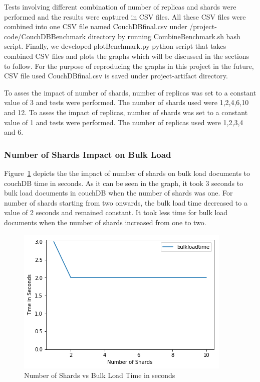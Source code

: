 Tests involving different combination of number of replicas and shards
were performed and the results were captured in CSV files. All these
CSV files were combined into one CSV file named CouchDBfinal.csv under
/project-code/CouchDBBenchmark directory by running
CombineBenchmark.sh bash script. Finally, we developed
plotBenchmark.py python script that takes combined CSV files and plots
the graphs which will be discussed in the sections to follow. For the
purpose of reproducing the graphs in this project in the future, CSV file used
CouchDBfinal.csv is saved under project-artifact directory. 

To asses the impact of number of shards, number of replicas was set to a
constant value of 3 and tests were performed. The number of shards
used were 1,2,4,6,10 and 12. To asses the impact of replicas, number
of shards was set to a constant value of 1 and tests were
performed. The number of replicas used were 1,2,3,4 and 6.



\subsubsection{Number of Shards Impact on Bulk Load}


Figure~\ref{f:shard-bulk} depicts the the impact of number of shards
on bulk load documents to couchDB time in seconds. As it can be seen
in the graph, it took 3 seconds to bulk load documents in couchDB when
the number of shards was one. For number of shards starting from
two onwards, the bulk load time decreased to a value of 2 seconds and remained
constant. It took less time for bulk load documents when the number of
shards increased from one to two.

\begin{figure}[!ht]
  \centering\includegraphics[width=\columnwidth]{../images/ShardsBulkLoad.png}
  \caption{Number of Shards vs Bulk Load Time in seconds }\label{f:shard-bulk}
\end{figure}



